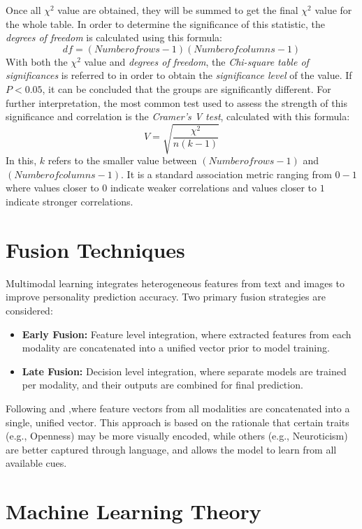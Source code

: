 Once all $\chi^2$ value are obtained, they will be summed to get the final $\chi^2$ value for the whole table. In order to determine the significance of this statistic, the \textit{degrees of freedom} is calculated using this formula:
$$df = (Number of rows - 1)(Number of columns - 1)$$
With both the $\chi^2$ value and \textit{degrees of freedom}, the \textit{Chi-square table of significances} is referred to in order to obtain the \textit{significance level} of the value. If $P < 0.05$, it can be concluded that the groups are significantly different. For further interpretation, the most common test used to assess the strength of this significance and correlation is the \textit{Cramer’s V test}, calculated with this formula:
$$V = \sqrt{ \frac{ \chi^2 }{ n(k - 1) } }$$
In this, $k$ refers to the smaller value between $(Number of rows - 1)$ and $(Number of columns - 1)$. It is a standard association metric ranging from $0-1$ where values closer to $0$ indicate weaker correlations and values closer to $1$ indicate stronger correlations.

\section{Fusion Techniques}

Multimodal learning integrates heterogeneous features from text and images to improve personality prediction accuracy. Two primary fusion strategies are considered:

\begin{itemize}
	\item \textbf{Early Fusion:} Feature level integration, where extracted features from each modality are concatenated into a unified vector prior to model training.
	\item \textbf{Late Fusion:} Decision level integration, where separate models are trained per modality, and their outputs are combined for final prediction.
\end{itemize}

Following \citet{liu2022} and \citet{kampman2018},where feature vectors from all modalities are concatenated into a single, unified vector. This approach is based on the rationale that certain traits (e.g., Openness) may be more visually encoded, while others (e.g., Neuroticism) are better captured through language, and allows the model to learn from all available cues.

\section{Machine Learning Theory}

